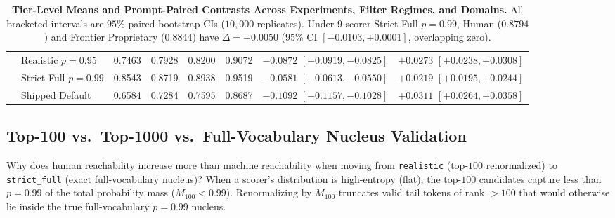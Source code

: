 \documentclass[11pt,a4paper,twocolumn]{article}
\begin{document}
\begin{table}[t]
{\begin{tabular}{llcccccc}
 & Realistic $p=0.95$ & 0.7463 & 0.7928 & 0.8200 & 0.9072 & $-0.0872$ $[-0.0919, -0.0825]$ & $+0.0273$ $[+0.0238, +0.0308]$ \\
 & Strict-Full $p=0.99$ & 0.8543 & 0.8719 & 0.8938 & 0.9519 & $-0.0581$ $[-0.0613, -0.0550]$ & $+0.0219$ $[+0.0195, +0.0244]$ \\
 & Shipped Default & 0.6584 & 0.7284 & 0.7595 & 0.8687 & $-0.1092$ $[-0.1157, -0.1028]$ & $+0.0311$ $[+0.0264, +0.0358]$ \\
\bottomrule
\end{tabular}%
}
\caption{\textbf{Tier-Level Means and Prompt-Paired Contrasts Across Experiments, Filter Regimes, and Domains.} All bracketed intervals are $95\%$ paired bootstrap CIs ($10{,}000$ replicates). Under 9-scorer Strict-Full $p=0.99$, Human ($0.8794$) and Frontier Proprietary ($0.8844$) have $\Delta = -0.0050$ ($95\%$ CI $[-0.0103, +0.0001]$, overlapping zero).}
\label{tab:tier_contrasts}
\end{table}

\subsection{Top-100 vs.\ Top-1000 vs.\ Full-Vocabulary Nucleus Validation}
Why does human reachability increase more than machine reachability when moving from \texttt{realistic} (top-$100$ renormalized) to \texttt{strict\_full} (exact full-vocabulary nucleus)? When a scorer's distribution is high-entropy (flat), the top-$100$ candidates capture less than $p=0.99$ of the total probability mass ($M_{100} < 0.99$). Renormalizing by $M_{100}$ truncates valid tail tokens of rank $>100$ that would otherwise lie inside the true full-vocabulary $p=0.99$ nucleus.
\end{document}
